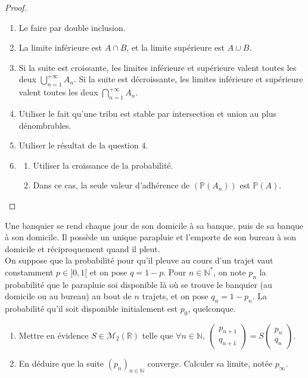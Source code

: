 \documentclass[french,a4paper]{article}
\renewcommand{\P}{\mathbb{P}}
\newcommand{\N}{\mathbb{N}}
\newcommand{\R}{\mathbb{R}}
\newcommand{\st}{^*}
\theoremstyle{plain}
\theoremstyle{definition}
\theoremstyle{remark}
\begin{document}
\begin{proof}
	\begin{enumerate}
		\item Le faire par double inclusion.
		\item La limite inférieure est $A\cap B$, et la limite supérieure est $A\cup B$.
		\item Si la suite est croissante, les limites inférieure et supérieure valent toutes les deux $\displaystyle\bigcup_{n=1}^{+\infty}A_n$. Si la suite est décroissante, les limites inférieure et supérieure valent toutes les deux $\displaystyle\bigcap_{n=1}^{+\infty}A_n$.
		\item Utiliser le fait qu'une tribu est stable par intersection et union au plus dénombrables.
		\item Utiliser le résultat de la question $4$.
		\item \begin{enumerate}[label=\alph*.]
			\item Utiliser la croissance de la probabilité.
			\item Dans ce cas, la seule valeur d'adhérence de $(\P(A_n))$ est $\P(A)$.
		\end{enumerate}
	\end{enumerate}
\end{proof}

\begin{ex}{}
	Une banquier se rend chaque jour de son domicile à sa banque, puis de sa banque à son domicile. Il possède un unique parapluie et l'emporte de son bureau à son domicile et réciproquement quand il pleut. \\ On suppose que la probabilité pour qu'il pleuve au cours d'un trajet vaut constamment $p\in]0,1[$ et on pose $q=1-p$. Pour $n\in\N\st$, on note $p_n$ la probabilité que le parapluie soi disponible là où se trouve le banquier (au domicile ou au bureau) au bout de $n$ trajets, et on pose $q_n=1-p_n$. La probabilité qu'il soit disponible initialement est $p_0$, quelconque.
	\begin{enumerate}
		\item Mettre en évidence $S\in\mathcal{M}_2(\R)$ telle que $\forall n\in\N,\ \displaystyle\begin{pmatrix}
			p_{n+1}\\ q_{n+1}
		\end{pmatrix}=S\begin{pmatrix}
		p_n\\ q_n
		\end{pmatrix}$.
		\item En déduire que la suite $(p_n)_{n\in\N}$ converge. Calculer sa limite, notée $p_\infty$.
	\end{enumerate}
\end{ex}
\end{document}
